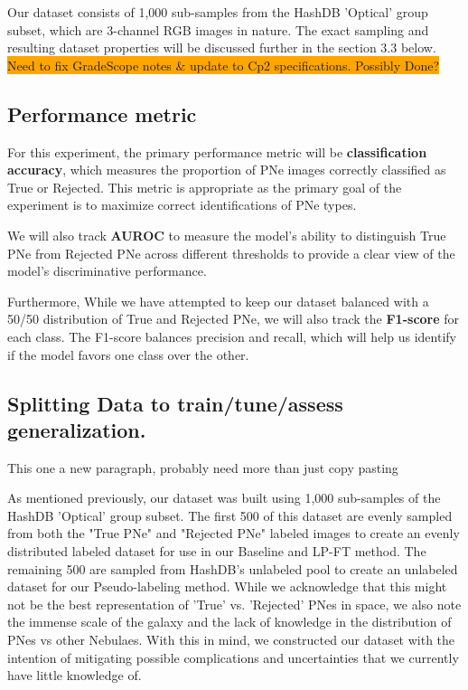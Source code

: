 \documentclass{article}
\begin{document}
Our dataset consists of 1,000 sub-samples from the HashDB 'Optical' group subset, which are 3-channel RGB images in nature. The exact sampling and resulting dataset properties will be discussed further in the section 3.3 below. \colorbox{orange}{Need to fix GradeScope notes \& update to Cp2 specifications. Possibly Done?}

\subsection{Performance metric}
For this experiment, the primary performance metric will be \textbf{classification accuracy}, which measures the proportion of PNe images correctly classified as True or Rejected. This metric is appropriate as the primary goal of the experiment is to maximize correct identifications of PNe types.

We will also track \textbf{AUROC} to measure the model’s ability to distinguish True PNe from Rejected PNe across different thresholds to provide a clear view of the model's discriminative performance.

Furthermore, While we have attempted to keep our dataset balanced with a 50/50 distribution of True and Rejected PNe, we will also track the \textbf{F1-score} for each class. The F1-score balances precision and recall, which will help us identify if the model favors one class over the other.

\subsection{Splitting Data to train/tune/assess generalization.}
{\color{red} This one a new paragraph, probably need more than just copy pasting}

As mentioned previously, our dataset was built using 1,000 sub-samples of the HashDB 'Optical' group subset. The first 500 of this dataset are evenly sampled from both the "True PNe" and "Rejected PNe" labeled images to create an evenly distributed labeled dataset for use in our Baseline and LP-FT method. The remaining 500 are sampled from HashDB's unlabeled pool to create an unlabeled dataset for our Pseudo-labeling method. While we acknowledge that this might not be the best representation of 'True' vs. 'Rejected' PNes in space, we also note the immense scale of the galaxy and the lack of knowledge in the distribution of PNes vs other Nebulaes. With this in mind, we constructed our dataset with the intention of mitigating possible complications and uncertainties that we currently have little knowledge of.
\end{document}
